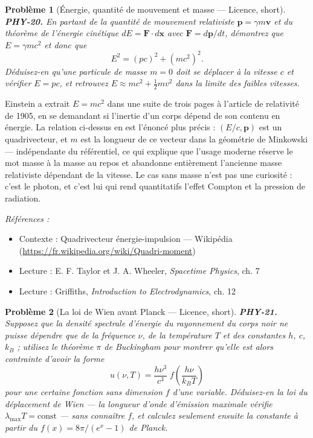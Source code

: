 \documentclass[11pt]{article}
\newtheorem{problem}{Problème}
\newenvironment{refs}{\par\small\noindent\emph{Références :}\begin{itemize}\setlength\itemsep{0pt}}{\end{itemize}\normalsize}
\begin{document}
\bigskip

\begin{problem}[{Énergie, quantité de mouvement et masse --- Licence, short}]
\textbf{PHY-20.} En partant de la quantité de mouvement relativiste
$\mathbf{p} = \gamma m \mathbf{v}$ et du théorème de l'énergie cinétique
$dE = \mathbf{F}\cdot d\mathbf{x}$ avec $\mathbf{F} = d\mathbf{p}/dt$, démontrez que
$E = \gamma m c^2$ et donc que
\[ E^2 = (pc)^2 + (mc^2)^2. \]
Déduisez-en qu'une particule de masse $m = 0$ doit se déplacer à la vitesse $c$ et vérifier
$E = pc$, et retrouvez $E \approx mc^2 + \tfrac12 mv^2$ dans la limite des faibles
vitesses.
\end{problem}

\noindent Einstein a extrait $E = mc^2$ dans une suite de trois pages à l'article de
relativité de 1905, en se demandant si l'inertie d'un corps dépend de son contenu en énergie. La
relation ci-dessus en est l'énoncé plus précis : $(E/c, \mathbf{p})$ est un quadrivecteur, et
$m$ est la longueur de ce vecteur dans la géométrie de Minkowski --- indépendante du référentiel,
ce qui explique que l'usage moderne réserve le mot \og{} masse \fg{} à la masse au repos et abandonne
entièrement l'ancienne \og{} masse relativiste \fg{} dépendant de la vitesse. Le cas sans masse n'est pas
une curiosité : c'est le photon, et c'est lui qui rend quantitatifs l'effet Compton et la pression
de radiation.

\begin{refs}
\item Contexte : Quadrivecteur énergie-impulsion --- Wikipédia (\url{https://fr.wikipedia.org/wiki/Quadri-moment})
\item Lecture : E. F. Taylor et J. A. Wheeler, \textit{Spacetime Physics}, ch. 7
\item Lecture : Griffiths, \textit{Introduction to Electrodynamics}, ch. 12
\end{refs}

\bigskip

\begin{problem}[{La loi de Wien avant Planck --- Licence, short}]
\textbf{PHY-21.} Supposez que la densité spectrale d'énergie du rayonnement
du corps noir ne puisse dépendre que de la fréquence $\nu$, de la température $T$ et des
constantes $h$, $c$, $k_B$ ; utilisez le théorème $\pi$ de Buckingham pour montrer qu'elle est
alors contrainte d'avoir la forme
\[ u(\nu,T) = \frac{h\nu^3}{c^3}\; f\!\left(\frac{h\nu}{k_B T}\right) \]
pour une certaine fonction sans dimension $f$ d'une variable. Déduisez-en la loi du déplacement
de Wien --- la longueur d'onde d'émission maximale vérifie $\lambda_{\max} T = \text{const}$ ---
sans connaître $f$, et calculez seulement ensuite la constante à partir du
$f(x) = 8\pi/(e^{x}-1)$ de Planck.
\end{problem}
\end{document}
